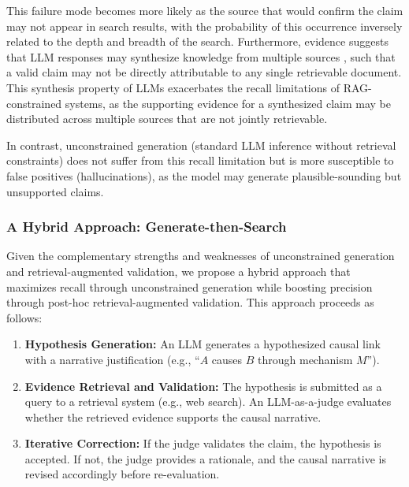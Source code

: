 This failure mode becomes more likely as the source that would confirm the claim may not appear in search results, with the probability of this occurrence inversely related to the depth and breadth of the search. Furthermore, evidence suggests that LLM responses may synthesize knowledge from multiple sources \citep{wang2023source,park2024identifyingsourcegenerationlarge}, such that a valid claim may not be directly attributable to any single retrievable document. This synthesis property of LLMs exacerbates the recall limitations of RAG-constrained systems, as the supporting evidence for a synthesized claim may be distributed across multiple sources that are not jointly retrievable.

In contrast, unconstrained generation (standard LLM inference without retrieval constraints) does not suffer from this recall limitation but is more susceptible to false positives (hallucinations), as the model may generate plausible-sounding but unsupported claims.

\subsubsection{A Hybrid Approach: Generate-then-Search}

Given the complementary strengths and weaknesses of unconstrained generation and retrieval-augmented validation, we propose a hybrid approach that maximizes recall through unconstrained generation while boosting precision through post-hoc retrieval-augmented validation. This approach proceeds as follows:

\begin{enumerate}
    \item \textbf{Hypothesis Generation:} An LLM generates a hypothesized causal link with a narrative justification (e.g., ``$A$ causes $B$ through mechanism $M$'').
    
    \item \textbf{Evidence Retrieval and Validation:} The hypothesis is submitted as a query to a retrieval system (e.g., web search). An LLM-as-a-judge evaluates whether the retrieved evidence supports the causal narrative.
    
    \item \textbf{Iterative Correction:} If the judge validates the claim, the hypothesis is accepted. If not, the judge provides a rationale, and the causal narrative is revised accordingly before re-evaluation.
\end{enumerate}


